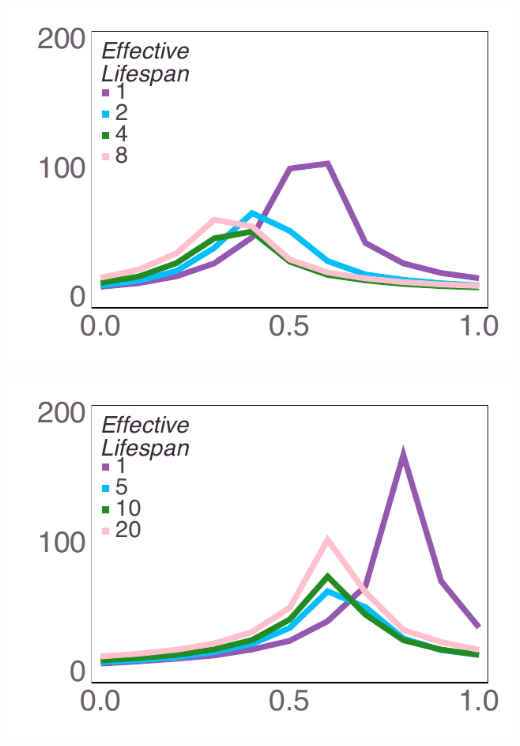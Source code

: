 \documentclass[varwidth=true,crop=false]{standalone}
\begin{document}
	\begin{minipage}{3.75in}%
      \includegraphics[width=\textwidth]{Figures/step_over_u_lowpayoff=0.1_nbehaviors=4.pdf}
    \end{minipage}\noindent
	\begin{minipage}{3.75in}%
      \includegraphics[width=\textwidth]{Figures/step_over_u_lowpayoff=0.1_nbehaviors=10.pdf}
    \end{minipage}~\\[0.5em]
\end{document}
